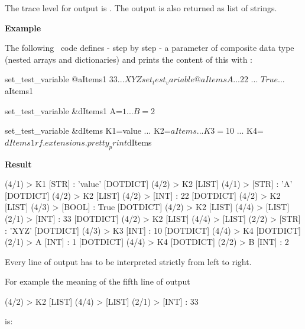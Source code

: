 The trace level for output is . The output is also returned as list of strings.

\newpage

\textbf{Example}

The following \rfw\ code defines - step by step - a parameter of composite data type (nested arrays and dictionaries)
and prints the content of this with :

\begin{robotcode}
set_test_variable    @{aItems1}    ${33}
...                                XYZ

set_test_variable    @{aItems}     A
...                                ${22}
...                                ${True}
...                                ${aItems1}

set_test_variable    &{dItems1}    A=${1}
...                                B=${2}

set_test_variable    &{dItems}     K1=value
...                                K2=${aItems}
...                                K3=${10}
...                                K4=${dItems1}

rf.extensions.pretty_print    ${dItems}
\end{robotcode}

\textbf{Result}

\begin{robotlog}
[DOTDICT] (4/1) > {K1} [STR]  :  'value'
[DOTDICT] (4/2) > {K2} [LIST] (4/1) > [STR]  :  'A'
[DOTDICT] (4/2) > {K2} [LIST] (4/2) > [INT]  :  22
[DOTDICT] (4/2) > {K2} [LIST] (4/3) > [BOOL]  :  True
[DOTDICT] (4/2) > {K2} [LIST] (4/4) > [LIST] (2/1) > [INT]  :  33
[DOTDICT] (4/2) > {K2} [LIST] (4/4) > [LIST] (2/2) > [STR]  :  'XYZ'
[DOTDICT] (4/3) > {K3} [INT]  :  10
[DOTDICT] (4/4) > {K4} [DOTDICT] (2/1) > {A} [INT]  :  1
[DOTDICT] (4/4) > {K4} [DOTDICT] (2/2) > {B} [INT]  :  2
\end{robotlog}

Every line of output has to be interpreted strictly from left to right.

For example the meaning of the fifth line of output

\begin{robotlog}
[DOTDICT] (4/2) > {K2} [LIST] (4/4) > [LIST] (2/1) > [INT]  :  33
\end{robotlog}

is:

